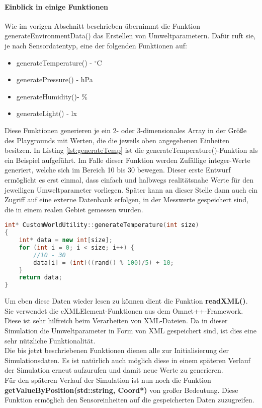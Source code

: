 \paragraph{Einblick in einige Funktionen}

Wie im vorigen Abschnitt beschrieben übernimmt die Funktion generateEnvironmentData() das Erstellen von Umweltparametern. Dafür ruft sie, je nach Sensordatentyp, eine der folgenden Funktionen auf:

\begin{multicols}{2}
\begin{itemize}
\item generateTemperature() - $^\circ $C
\item generatePressure() - hPa
\item generateHumidity()- \%
\item generateLight() - lx
\end{itemize}
\end{multicols}

Diese Funktionen generieren je ein 2- oder 3-dimensionales Array in der Größe des Playgrounds mit Werten, die die jeweils oben angegebenen Einheiten besitzen. In Listing \ref{lst:generateTemp} ist die generateTemperature()-Funktion als ein Beispiel aufgeführt. Im Falle dieser Funktion werden Zufällige integer-Werte generiert, welche sich im Bereich 10 bis 30 bewegen. Dieser erste Entwurf ermöglicht es erst einmal, dass einfach und halbwegs realitätsnahe Werte für den jeweiligen Umweltparameter vorliegen. Später kann an dieser Stelle dann auch ein Zugriff auf eine externe Datenbank erfolgen, in der Messwerte gespeichert sind, die in einem realen Gebiet gemessen wurden.

\begin{lstlisting}[language=C++, label=lst:generateTemp]
int* CustomWorldUtility::generateTemperature(int size)
{
    int* data = new int[size];
    for (int i = 0; i < size; i++) {
        //10 - 30
        data[i] = (int)((rand() % 100)/5) + 10;
    }
    return data;
}
\end{lstlisting}

Um eben diese Daten wieder lesen zu können dient die Funktion \textbf{readXML()}. Sie verwendet die cXMLElement-Funktionen aus dem Omnet++-Framework. Diese ist sehr hilfreich beim Verarbeiten von XML-Dateien. Da in dieser Simulation die Umweltparameter in Form von XML gespeichert sind, ist dies eine sehr nützliche Funktionalität.\\
Die bis jetzt beschriebenen Funktionen dienen alle zur Initialisierung der Simulationsdaten. Es ist natürlich auch möglich diese in einem späteren Verlauf der Simulation erneut aufzurufen und damit neue Werte zu generieren. \\
Für den späteren Verlauf der Simulation ist nun noch die Funktion \textbf{getValueByPosition(std::string, Coord*)} von großer Bedeutung. Diese Funktion ermöglich den Sensoreinheiten auf die gespeicherten Daten zuzugreifen.

